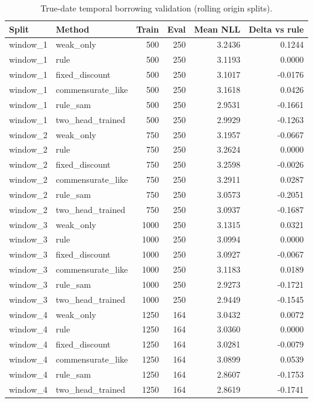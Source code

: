 \begin{table}[htbp]
\centering
\small
\caption{True-date temporal borrowing validation (rolling origin splits).}
\label{tab:temporal-rolling}
\begin{tabular}{llrrrr}
\toprule
Split & Method & Train & Eval & Mean NLL & Delta vs rule \\
\midrule
window\_1 & weak\_only & 500 & 250 & 3.2436 & 0.1244 \\
window\_1 & rule & 500 & 250 & 3.1193 & 0.0000 \\
window\_1 & fixed\_discount & 500 & 250 & 3.1017 & -0.0176 \\
window\_1 & commensurate\_like & 500 & 250 & 3.1618 & 0.0426 \\
window\_1 & rule\_sam & 500 & 250 & 2.9531 & -0.1661 \\
window\_1 & two\_head\_trained & 500 & 250 & 2.9929 & -0.1263 \\
window\_2 & weak\_only & 750 & 250 & 3.1957 & -0.0667 \\
window\_2 & rule & 750 & 250 & 3.2624 & 0.0000 \\
window\_2 & fixed\_discount & 750 & 250 & 3.2598 & -0.0026 \\
window\_2 & commensurate\_like & 750 & 250 & 3.2911 & 0.0287 \\
window\_2 & rule\_sam & 750 & 250 & 3.0573 & -0.2051 \\
window\_2 & two\_head\_trained & 750 & 250 & 3.0937 & -0.1687 \\
window\_3 & weak\_only & 1000 & 250 & 3.1315 & 0.0321 \\
window\_3 & rule & 1000 & 250 & 3.0994 & 0.0000 \\
window\_3 & fixed\_discount & 1000 & 250 & 3.0927 & -0.0067 \\
window\_3 & commensurate\_like & 1000 & 250 & 3.1183 & 0.0189 \\
window\_3 & rule\_sam & 1000 & 250 & 2.9273 & -0.1721 \\
window\_3 & two\_head\_trained & 1000 & 250 & 2.9449 & -0.1545 \\
window\_4 & weak\_only & 1250 & 164 & 3.0432 & 0.0072 \\
window\_4 & rule & 1250 & 164 & 3.0360 & 0.0000 \\
window\_4 & fixed\_discount & 1250 & 164 & 3.0281 & -0.0079 \\
window\_4 & commensurate\_like & 1250 & 164 & 3.0899 & 0.0539 \\
window\_4 & rule\_sam & 1250 & 164 & 2.8607 & -0.1753 \\
window\_4 & two\_head\_trained & 1250 & 164 & 2.8619 & -0.1741 \\
\bottomrule
\end{tabular}
\end{table}
